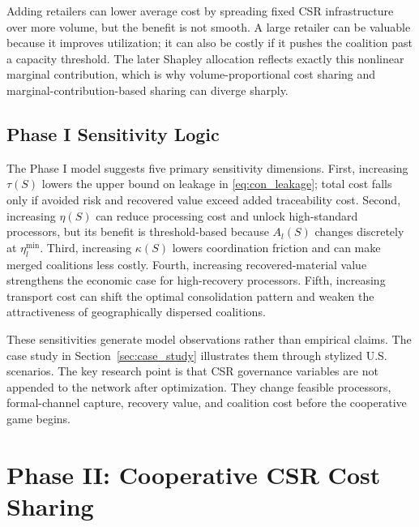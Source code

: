 Adding retailers can lower average cost by spreading fixed CSR infrastructure over more volume, but the benefit is not smooth. A large retailer can be valuable because it improves utilization; it can also be costly if it pushes the coalition past a capacity threshold. The later Shapley allocation reflects exactly this nonlinear marginal contribution, which is why volume-proportional cost sharing and marginal-contribution-based sharing can diverge sharply.

\subsection{Phase I Sensitivity Logic}

The Phase I model suggests five primary sensitivity dimensions. First, increasing $\tau(S)$ lowers the upper bound on leakage in \eqref{eq:con_leakage}; total cost falls only if avoided risk and recovered value exceed added traceability cost. Second, increasing $\eta(S)$ can reduce processing cost and unlock high-standard processors, but its benefit is threshold-based because $A_l(S)$ changes discretely at $\eta_l^{\min}$. Third, increasing $\kappa(S)$ lowers coordination friction and can make merged coalitions less costly. Fourth, increasing recovered-material value strengthens the economic case for high-recovery processors. Fifth, increasing transport cost can shift the optimal consolidation pattern and weaken the attractiveness of geographically dispersed coalitions.

These sensitivities generate model observations rather than empirical claims. The case study in Section~\ref{sec:case_study} illustrates them through stylized U.S. scenarios. The key research point is that CSR governance variables are not appended to the network after optimization. They change feasible processors, formal-channel capture, recovery value, and coalition cost before the cooperative game begins.

\section{Phase II: Cooperative CSR Cost Sharing}
\label{sec:game_theory}

